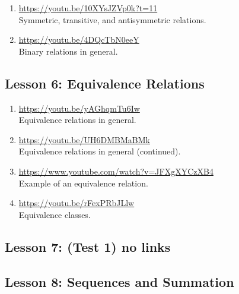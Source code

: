\documentclass[11pt]{amsart}
\begin{document}
\begin{enumerate}

\item \url{https://youtu.be/10XYsJZVp0k?t=11}\\
Symmetric, transitive, and antisymmetric relations.\\[5pt]


\item \url{https://youtu.be/4DQcTbN0eeY}\\
Binary relations in general.\\[5pt]


\end{enumerate}




\subsection{Lesson 6: Equivalence Relations}

\begin{enumerate}

\item \url{https://youtu.be/yAGhqmTu6Iw}\\
Equivalence relations in general.\\[5pt]

\item \url{https://youtu.be/UH6DMBMaBMk}\\
Equivalence relations in general (continued).\\[5pt]

\item \url{https://www.youtube.com/watch?v=JFXgXYCzXB4}\\
Example of an equivalence relation.\\[5pt]

\item \url{https://youtu.be/rFexPRbJLlw}\\
Equivalence classes.\\[5pt]

\end{enumerate}

\subsection{Lesson 7: (Test 1) no links}

\subsection{Lesson 8: Sequences and Summation}
\end{document}
